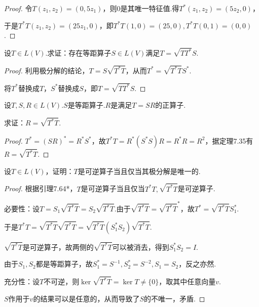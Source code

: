\begin{proof}
    令\(T(z_1,z_2)=(0,5z_1)\)，则\(0\)是其唯一特征值.得\(T^*(z_1,z_2)=(5z_2,0)\)，
    
    于是\(T^*T(z_1,z_2)=(25z_1,0)\)，即\(T^*T(1,0)=(25,0),T^*T(0,1)=(0,0)\).
\end{proof}

\begin{problem}[3]\label{7.D.3}
    设\(T \in L(V)\).求证：存在等距算子\(S \in L(V)\)满足\(T=\sqrt{TT^*}S\).
\end{problem}

\begin{proof}
    利用极分解的结论，\(T=S\sqrt{T^*T}\)，从而\(T^*=\sqrt{T^*T}S^*\).

    将\(T^*\)替换成\(T\)，\(S^*\)替换成\(S\)，即\(T=\sqrt{TT^*}S\).
\end{proof}

\begin{problem}[8]\label{7.D.8}
    设\(T,S,R \in L(V)\).\(S\)是等距算子.\(R\)是满足\(T=SR\)的正算子.
    
    求证：\(R=\sqrt{T^*T}\).
\end{problem}

\begin{proof}
    \(T^*=(SR)^*=R^*S^*\)，故\(T^*T=R^*(S^*S)R=R^*R=R^2\)，据定理7.35有\(R=\sqrt{T^*T}\).
\end{proof}

\begin{problem}[9]\label{7.D.9}
    设\(T \in L(V)\)，证明：\(T\)是可逆算子当且仅当其极分解是唯一的.
\end{problem}

\begin{proof}
    根据引理7.64*，\(T\)是可逆算子当且仅当\(T^*T,\sqrt{T^*T}\)是可逆算子.

    必要性：设\(T=S_1\sqrt{T^*T}=S_2\sqrt{T^*T}\).由于\(\sqrt{T^*T}=\sqrt{T^*T}^*\)，故\(T^*=\sqrt{T^*T}S_1^*\).
    
    于是\(T^*T=\sqrt{T^*T}\sqrt{T^*T}=\sqrt{T^*T}(S_1^*S_2)\sqrt{T^*T}\).
    
    \(\sqrt{T^*T}\)是可逆算子，故两侧的\(\sqrt{T^*T}\)可以被消去，得到\(S_1^*S_2=I\).
    
    由于\(S_1,S_2\)都是等距算子，故\(S_1^*=S^{-1},S_2^*=S^{-2},S_1=S_2\)，反之亦然.
    
    充分性：设\(T\)不可逆，则\(\ker \sqrt{T^*T}=\ker T \ne \{0\}\)，取其中任意向量\(v\).
    
    \(S\)作用于\(v\)的结果可以是任意的，从而导致了\(S\)的不唯一，矛盾.
\end{proof}

